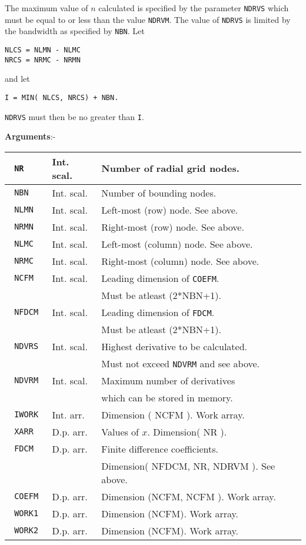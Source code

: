The maximum value of $n$ calculated is specified by
the parameter \verb+NDRVS+ which must be equal to or
less than the value \verb+NDRVM+. The value of
\verb+NDRVS+ is limited by the bandwidth as specified
by \verb+NBN+. Let
\begin{verbatim}
NLCS = NLMN - NLMC
NRCS = NRMC - NRMN
\end{verbatim}
and let
\begin{verbatim}
I = MIN( NLCS, NRCS) + NBN.
\end{verbatim}
\verb+NDRVS+ must then be no greater than \verb+I+.

{\bf Arguments}:- \newline

\begin{tabular}{|l|l|l|}
\hline
\verb+ NR  + & Int. scal. & Number of radial grid nodes. \\
\hline
\verb+ NBN   + & Int. scal. & Number of bounding nodes. \\
\hline
\verb+ NLMN + & Int. scal. & Left-most (row) node. See above.\\
\hline
\verb+ NRMN + & Int. scal. & Right-most (row) node. See above.\\
\hline
\verb+ NLMC + & Int. scal. & Left-most (column) node. See above.\\
\hline
\verb+ NRMC + & Int. scal. & Right-most (column) node. See above.\\
\hline
\verb+ NCFM + & Int. scal. & Leading dimension of
\verb+COEFM+. \\
& & Must be atleast (2*NBN+1). \\
\hline
\verb+ NFDCM + & Int. scal. & Leading dimension of
\verb+FDCM+. \\
& & Must be atleast (2*NBN+1). \\
\hline
\verb+ NDVRS + & Int. scal. & Highest derivative to be calculated. \\
& & Must not exceed \verb+NDVRM+ and see above. \\
\hline
\verb+ NDVRM + & Int. scal. & Maximum number of derivatives \\
& & which can be stored in memory. \\
\hline
\verb+ IWORK + & Int. arr. & Dimension ( NCFM ). Work array. \\
\hline
\verb+ XARR + & D.p. arr. & Values of $x$. Dimension( NR ). \\
\hline
\verb+ FDCM + & D.p. arr. & Finite difference coefficients. \\
& & Dimension( NFDCM, NR, NDRVM ). See above. \\
\hline
\verb+ COEFM + & D.p. arr. & Dimension (NCFM, NCFM ). Work array. \\
\hline
\verb+ WORK1 + & D.p. arr. & Dimension (NCFM). Work array. \\
\hline
\verb+ WORK2 + & D.p. arr. & Dimension (NCFM). Work array. \\
\hline
\end{tabular} \newline


